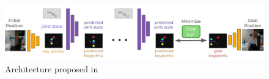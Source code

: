 \begin{figure}[th]
    \centering
    \includegraphics[width=\textwidth]{figures/images/model_based_irl/model_based_irl.jpg}
    \caption{Architecture proposed in~\cite{das2021model_based_irl_from_vd}}
    \label{fig:model_based_irl}
\end{figure}
